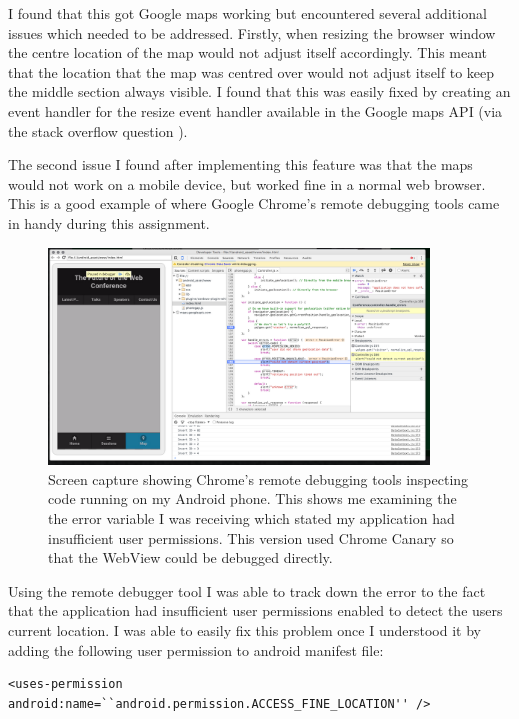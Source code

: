 \documentclass[paper=a4, fontsize=11pt]{scrartcl}	%
\numberwithin{equation}{section}															%
\numberwithin{figure}{section}																%
\numberwithin{table}{section}
\begin{document}
I found that this got Google maps working but encountered several additional issues which needed to be addressed. Firstly, when resizing the browser window the centre location of the map would not adjust itself accordingly. This meant that the location that the map was centred over would not adjust itself to keep the middle section always visible. I found that this was easily fixed by creating an event handler for the resize event handler available in the Google maps API (via the stack overflow question \cite{google-maps-stackoverflow}).

The second issue I found after implementing this feature was that the maps would not work on a mobile device, but worked fine in a normal web browser. This is a good example of where Google Chrome's remote debugging tools came in handy during this assignment.

\begin{figure}[H]
\centering
\includegraphics[width=0.9\textwidth]{mobile-debugging.png}
\caption{Screen capture showing Chrome's remote debugging tools inspecting code running on my Android phone. This shows me examining the the error variable I was receiving which stated my application had insufficient user permissions. This version used Chrome Canary so that the WebView could be debugged directly.}
\label{fig:google-maps}
\end{figure}

Using the remote debugger tool I was able to track down the error to the fact that the application had insufficient user permissions enabled to detect the users current location. I was able to easily fix this problem once I understood it by adding the following user permission to android manifest file:

\begin{lstlisting}
<uses-permission android:name=``android.permission.ACCESS_FINE_LOCATION'' />	
\end{lstlisting}
\end{document}
